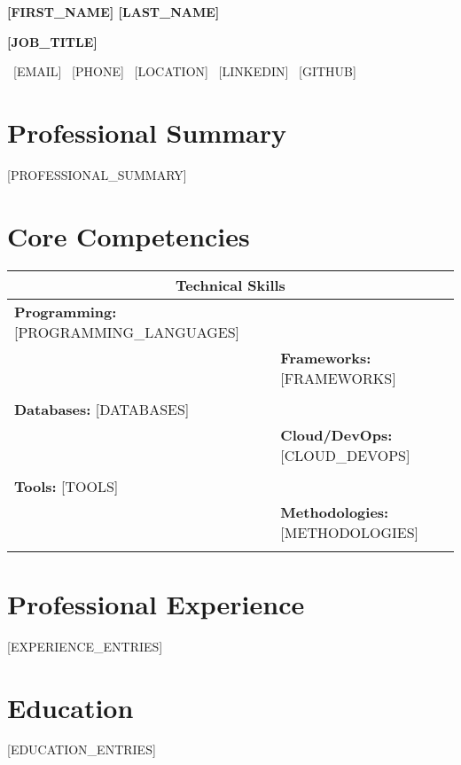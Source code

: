 \documentclass[12pt,letterpaper]{article}
\newcommand{\name}[2]{
    \begin{center}
        {\Huge\bfseries\color{darkgray}#1 #2}
    \end{center}
}
\newcommand{\contact}[5]{
    \begin{center}
        \color{lightgray}
        \faEnvelope\ #1 \quad 
        \faPhone\ #2 \quad 
        \faMapMarker\ #3 \quad 
        \faLinkedin\ #4 \quad 
        \faGithub\ #5
    \end{center}
    \vspace{10pt}
}
\newcommand{\jobtitle}[1]{
    \begin{center}
        {\Large\color{primaryblue}\textbf{#1}}
    \end{center}
    \vspace{5pt}
}
\newcommand{\workexp}[5]{
    \textbf{\color{darkgray}#1} \hfill {\color{lightgray}#2}\\
    \textit{\color{primaryblue}#3} \hfill {\color{lightgray}#4}\\
    \vspace{2pt}
    #5
    \vspace{8pt}
}
\newcommand{\education}[5]{
    \textbf{\color{darkgray}#1} \hfill {\color{lightgray}#2}\\
    \textit{\color{primaryblue}#3} \hfill {\color{lightgray}#4}\\
    #5
    \vspace{8pt}
}
\newcommand{\skillcategory}[2]{
    \textbf{\color{darkgray}#1:} #2\\
}
\begin{document}
\name{[FIRST_NAME]}{[LAST_NAME]}
\jobtitle{[JOB_TITLE]}
\contact{[EMAIL]}{[PHONE]}{[LOCATION]}{[LINKEDIN]}{[GITHUB]}

\section{Professional Summary}
\color{darkgray}
[PROFESSIONAL_SUMMARY]

\section{Core Competencies}
\begin{tabularx}{\textwidth}{|X|X|}
\hline
\multicolumn{2}{|c|}{\textbf{\color{primaryblue}Technical Skills}} \\
\hline
\skillcategory{Programming}{[PROGRAMMING_LANGUAGES]} &
\skillcategory{Frameworks}{[FRAMEWORKS]} \\
\hline
\skillcategory{Databases}{[DATABASES]} &
\skillcategory{Cloud/DevOps}{[CLOUD_DEVOPS]} \\
\hline
\skillcategory{Tools}{[TOOLS]} &
\skillcategory{Methodologies}{[METHODOLOGIES]} \\
\hline
\end{tabularx}

\section{Professional Experience}
[EXPERIENCE_ENTRIES]

\section{Education}
[EDUCATION_ENTRIES]
\end{document}
